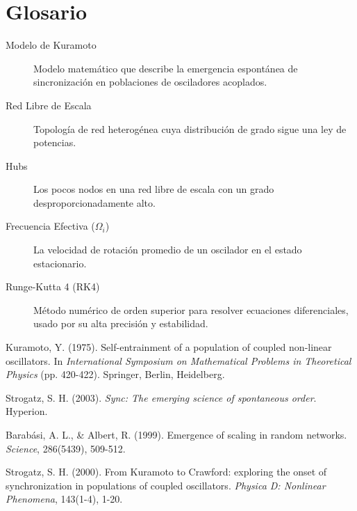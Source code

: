 \documentclass[12pt, a4paper]{article}
\begin{document}
\appendix
\section{Glosario}

\begin{description}
    \item[Modelo de Kuramoto] Modelo matemático que describe la emergencia espontánea de sincronización en poblaciones de osciladores acoplados.
    \item[Red Libre de Escala] Topología de red heterogénea cuya distribución de grado sigue una ley de potencias.
    \item[Hubs] Los pocos nodos en una red libre de escala con un grado desproporcionadamente alto.
    \item[Frecuencia Efectiva (\(\Omega_i\))] La velocidad de rotación promedio de un oscilador en el estado estacionario.
    \item[Runge-Kutta 4 (RK4)] Método numérico de orden superior para resolver ecuaciones diferenciales, usado por su alta precisión y estabilidad.
\end{description}

\begin{thebibliography}{9}
    Kuramoto, Y. (1975). Self-entrainment of a population of coupled non-linear oscillators. In \textit{International Symposium on Mathematical Problems in Theoretical Physics} (pp. 420-422). Springer, Berlin, Heidelberg.

    Strogatz, S. H. (2003). \textit{Sync: The emerging science of spontaneous order}. Hyperion.

    Barabási, A. L., \& Albert, R. (1999). Emergence of scaling in random networks. \textit{Science}, 286(5439), 509-512.

    Strogatz, S. H. (2000). From Kuramoto to Crawford: exploring the onset of synchronization in populations of coupled oscillators. \textit{Physica D: Nonlinear Phenomena}, 143(1-4), 1-20.

\end{thebibliography}
\end{document}
